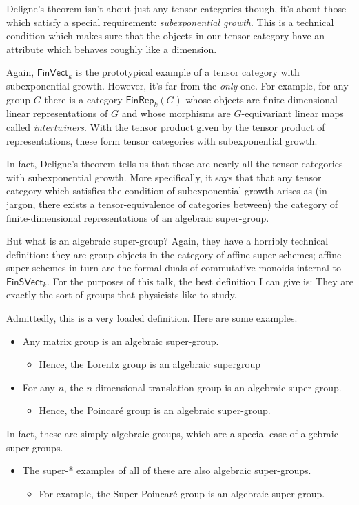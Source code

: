 \documentclass[a4paper]{report}
\theoremstyle{definition}
\theoremstyle{plain}
\theoremstyle{remark}
\begin{document}
Deligne's theorem isn't about just any tensor categories though, it's about those which satisfy a special requirement: \emph{subexponential growth}. This is a technical condition which makes sure that the objects in our tensor category have an attribute which behaves roughly like a dimension.

Again, $\mathsf{FinVect}_{k}$ is the prototypical example of a tensor category with subexponential growth. However, it's far from the \emph{only} one. For example, for any group $G$ there is a category $\mathsf{FinRep}_{k}(G)$ whose objects are finite-dimensional linear representations of $G$ and whose morphisms are $G$-equivariant linear maps called \emph{intertwiners}. With the tensor product given by the tensor product of representations, these form tensor categories with subexponential growth.

In fact, Deligne's theorem tells us that these are nearly all the tensor categories with subexponential growth. More specifically, it says that that any tensor category which satisfies the condition of subexponential growth arises as (in jargon, there exists a tensor-equivalence of categories between) the category of finite-dimensional representations of an algebraic super-group.

But what is an algebraic super-group? Again, they have a horribly technical definition: they are group objects in the category of affine super-schemes; affine super-schemes in turn are the formal duals of commutative monoids internal to $\mathsf{FinSVect}_{k}$. For the purposes of this talk, the best definition I can give is: They are exactly the sort of groups that physicists like to study. 

Admittedly, this is a very loaded definition. Here are some examples. 
\begin{itemize}
  \item Any matrix group is an algebraic super-group.
    \begin{itemize}
      \item Hence, the Lorentz group is an algebraic supergroup
    \end{itemize}

  \item For any $n$, the $n$-dimensional translation group is an algebraic super-group.
    \begin{itemize}
      \item Hence, the Poincar\'{e} group is an algebraic super-group.
    \end{itemize}
\end{itemize}
In fact, these are simply algebraic groups, which are a special case of algebraic super-groups. 
\begin{itemize}
  \item The super-* examples of all of these are also algebraic super-groups.
    \begin{itemize}
      \item For example, the Super Poincar\'{e} group is an algebraic super-group.
    \end{itemize}
\end{itemize}
\end{document}
